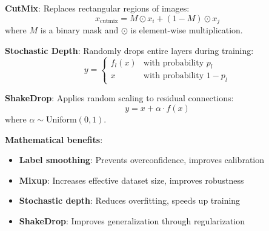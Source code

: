 \textbf{CutMix}:
Replaces rectangular regions of images:
\[
x_{\text{cutmix}} = M \odot x_i + (1 - M) \odot x_j
\]
where \(M\) is a binary mask and \(\odot\) is element-wise multiplication.

\textbf{Stochastic Depth}:
Randomly drops entire layers during training:
\[
y = \begin{cases}
f_l(x) & \text{with probability } p_l \\
x & \text{with probability } 1 - p_l
\end{cases}
\]

\textbf{ShakeDrop}:
Applies random scaling to residual connections:
\[
y = x + \alpha \cdot f(x)
\]
where \(\alpha \sim \text{Uniform}(0, 1)\).

\textbf{Mathematical benefits}:
\begin{itemize}
	\item \textbf{Label smoothing}: Prevents overconfidence, improves calibration
	\item \textbf{Mixup}: Increases effective dataset size, improves robustness
	\item \textbf{Stochastic depth}: Reduces overfitting, speeds up training
	\item \textbf{ShakeDrop}: Improves generalization through regularization
\end{itemize}
